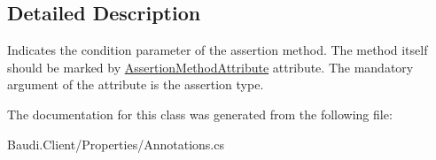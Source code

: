 \subsection{Detailed Description}
Indicates the condition parameter of the assertion method. The method itself should be marked by \hyperlink{class_assertion_method_attribute}{Assertion\+Method\+Attribute} attribute. The mandatory argument of the attribute is the assertion type. 



The documentation for this class was generated from the following file\+:\begin{DoxyCompactItemize}
\item 
Baudi.\+Client/\+Properties/Annotations.\+cs\end{DoxyCompactItemize}
